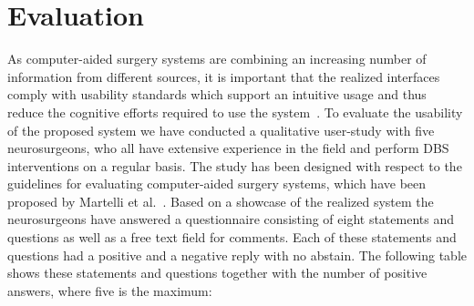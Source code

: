 \documentclass{vgtc}                          %
\begin{document}
\section{Evaluation}\label{sec:evaluation}
As computer-aided surgery systems are combining an increasing number of information from different sources, it is important that the realized interfaces comply with usability standards which support an intuitive usage and thus reduce the cognitive efforts required to use the system~\cite{Visarius1997,Martelli2003}. To evaluate the usability of the proposed system we have conducted a qualitative user-study with five neurosurgeons, who all have extensive experience in the field and perform DBS interventions on a regular basis. The study has been designed with respect to the guidelines for evaluating computer-aided surgery systems, which have been proposed by Martelli et al.~\cite{Martelli2003}. Based on a showcase of the realized system the neurosurgeons have answered a questionnaire consisting of eight statements and questions as well as a free text field for comments. Each of these statements and questions had a positive and a negative reply with no abstain. The following table shows these statements and questions together with the number of positive answers, where five is the maximum:

\end{document}
